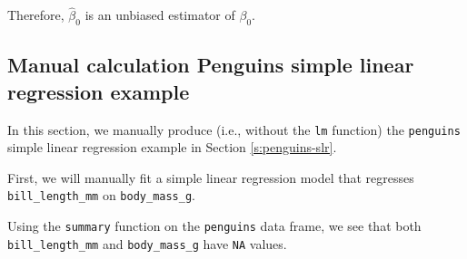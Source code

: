 \documentclass[
]{book}
\theoremstyle{definition}
\theoremstyle{definition}
\theoremstyle{definition}
\theoremstyle{definition}
\theoremstyle{remark}
\begin{document}
Therefore, \(\hat\beta_0\) is an unbiased estimator of \(\beta_0\).

\hypertarget{manual-calculation-penguins-simple-linear-regression-example}{%
\subsection{Manual calculation Penguins simple linear regression example}\label{manual-calculation-penguins-simple-linear-regression-example}}

In this section, we manually produce (i.e., without the \texttt{lm} function) the \texttt{penguins} simple linear regression example in Section \ref{s:penguins-slr}.

First, we will manually fit a simple linear regression model that regresses \texttt{bill\_length\_mm} on \texttt{body\_mass\_g}.

Using the \texttt{summary} function on the \texttt{penguins} data frame, we see that both \texttt{bill\_length\_mm} and \texttt{body\_mass\_g} have \texttt{NA} values.
\end{document}
